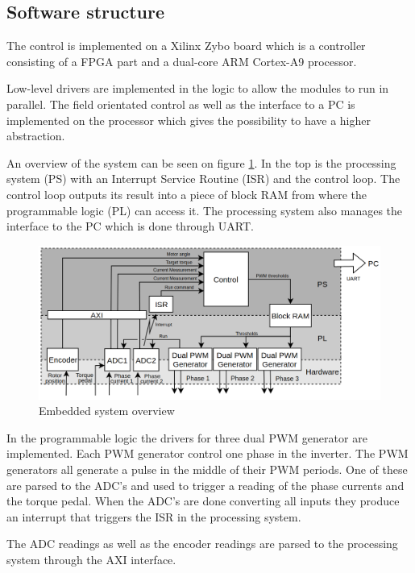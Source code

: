 \subsection{Software structure}
The control is implemented on a Xilinx Zybo board which is a controller consisting of a FPGA part and a dual-core ARM Cortex-A9 processor.

Low-level drivers are implemented in the logic to allow the modules to run in parallel. The field orientated control as well as the interface to a PC is implemented on the processor which gives the possibility to have a higher abstraction. 

An overview of the system can be seen on figure \ref{fig:embedded_overview}. In the top is the processing system (PS) with an Interrupt Service Routine (ISR) and the control loop. The control loop outputs its result into a piece of block RAM from where the programmable logic (PL) can access it. The processing system also manages the interface to the PC which is done through UART.

\begin{figure}[H]
	\centering
	\includegraphics[width=1\linewidth]{pictures/software/embedded_overview.png}
	\caption{Embedded system overview}
	\label{fig:embedded_overview}
\end{figure}


In the programmable logic the drivers for three dual PWM generator are implemented. Each PWM generator control one phase in the inverter. The PWM generators all generate a pulse in the middle of their PWM periods. One of these are parsed to the ADC's and used to trigger a reading of the phase currents and the torque pedal. When the ADC's are done converting all inputs they produce an interrupt that triggers the ISR in the processing system.

The ADC readings as well as the encoder readings are parsed to the processing system through the AXI interface.



